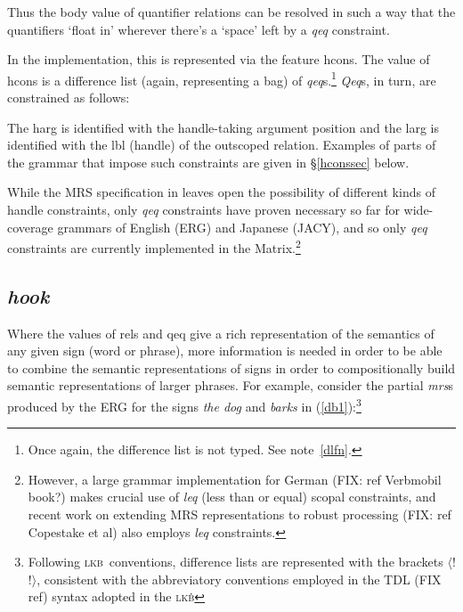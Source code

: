 \documentclass[12pt]{article}
\newcommand{\lkb}{\textsc{lkb}}
\newcommand{\es}{\enumsentence}
\newcommand{\fn}{\footnote}
\begin{document}
\noindent
Thus the {\sc body} value of quantifier relations can be resolved in
such a way that the quantifiers `float in' wherever there's a `space'
left by a {\it qeq} constraint.

In the implementation, this is represented via the feature {\sc
hcons}.  The value of {\sc hcons} is a difference list (again,
representing a bag) of {\it qeq}s.\fn{Once again, the difference list
is not typed.  See note~\ref{dlfn}.}  {\it Qeq}s, in turn, are
constrained as follows:

\es{
\begin{avm}
{\it qeq}: \[ harg & handle\\
	      larg & handle \]
\end{avm}
}

\noindent
The {\sc harg} is identified with the handle-taking argument position
and the {\sc larg} is identified with the {\sc lbl} (handle) of the outscoped
relation.  Examples of parts of the grammar that impose such constraints
are given in \S\ref{hconssec} below.

While the MRS specification in  leaves
open the possibility of different kinds of handle constraints, only
{\it qeq} constraints have proven necessary so far for wide-coverage
grammars of English (ERG) and Japanese (JACY), and so only
{\it qeq} constraints are currently implemented in the 
Matrix.\footnote{However, a large grammar implementation for German (FIX: ref 
Verbmobil book?) makes crucial use of {\it leq} (less than or equal) scopal
constraints, and recent work on extending MRS representations to robust 
processing (FIX: ref Copestake et al)
also employs {\it leq} constraints.}

\subsection{{\it hook}}
\label{hooksec}

Where the values of {\sc rels} and {\sc qeq} give a rich representation of 
the semantics of any given sign (word or phrase),
more information is needed in order to be able to combine the semantic
representations of signs in order to compositionally build
semantic representations of larger phrases.  For example, consider the
partial {\it mrs}s produced by the ERG for the signs {\it the dog} and 
{\it barks} in
(\ref{db1}):\fn{Following \lkb\ conventions, difference lists are
represented with the brackets $\langle$! !$\rangle$, consistent with the
abbreviatory conventions employed in the TDL (FIX ref)
syntax adopted in the \lkb\.}
\end{document}
